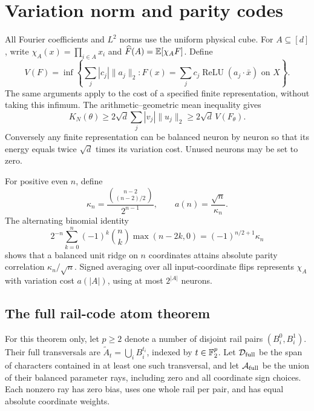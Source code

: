 \documentclass[11pt]{article}
\theoremstyle{remark}\newtheorem{remark}[theorem]{Remark}
\newcommand{\relu}{\operatorname{ReLU}}\newcommand{\Var}{\operatorname{Var}}
\begin{document}
\section{Variation norm and parity codes}

All Fourier coefficients and $L^2$ norms use the uniform physical cube.
For $A\subseteq[d]$, write $\chi_A(x)=\prod_{i\in A}x_i$ and
$\widehat F(A)=\mathbb E[\chi_A F]$. Define
\[
 V(F)=\inf\left\{\sum_j|c_j|\|a_j\|_2:
 F(x)=\sum_jc_j\relu(a_j\cdot\bar x)\text{ on }X\right\}.
\]
The same arguments apply to the cost of a specified finite
representation, without taking this infimum. The arithmetic--geometric
mean inequality gives
\begin{equation}\label{eq:energy-variation}
 K_N(\theta)\ge2\sqrt d\sum_j|v_j|\|u_j\|_2\ge2\sqrt d\,V(F_\theta).
\end{equation}
Conversely any finite representation can be balanced neuron by neuron
so that its energy equals twice $\sqrt d$ times its variation cost.
Unused neurons may be set to zero.

For positive even $n$, define
\begin{equation}\label{eq:parity-cost}
 \kappa_n=\frac{\binom{n-2}{(n-2)/2}}{2^{n-1}},\qquad
 a(n)=\frac{\sqrt n}{\kappa_n}.
\end{equation}
The alternating binomial identity
\[
 2^{-n}\sum_{k=0}^n(-1)^k\binom nk\max(n-2k,0)
 =(-1)^{n/2+1}\kappa_n
\]
shows that a balanced unit ridge on $n$ coordinates attains absolute
parity correlation $\kappa_n/\sqrt n$. Signed averaging over all
input-coordinate flips represents $\chi_A$ with variation cost
$a(|A|)$, using at most $2^{|A|}$ neurons.

\subsection{The full rail-code atom theorem}

For this theorem only, let $p\ge2$ denote a number of disjoint rail
pairs $(B_i^0,B_i^1)$. Their full transversals are
$\widetilde A_t=\bigcup_iB_i^{t_i}$, indexed by $t\in\mathbb F_2^p$.
Let $\mathcal D_{\rm full}$ be the span of characters contained in
at least one such transversal, and let $\mathcal A_{\rm full}$ be
the union of their balanced parameter rays, including zero and all
coordinate sign choices. Each nonzero ray has zero bias, uses one
whole rail per pair, and has equal absolute coordinate weights.
\end{document}
